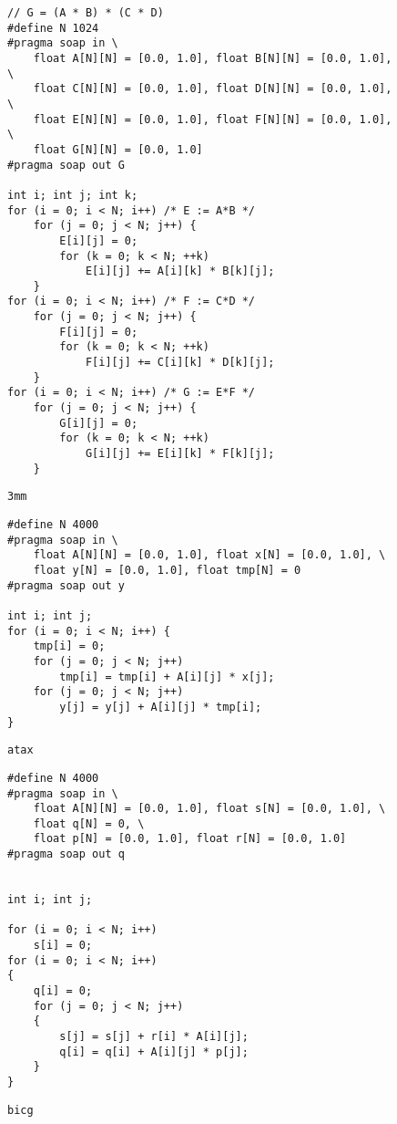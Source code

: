 \begin{figure}[ht]
\begin{lstlisting}
// G = (A * B) * (C * D)
#define N 1024
#pragma soap in \
    float A[N][N] = [0.0, 1.0], float B[N][N] = [0.0, 1.0], \
    float C[N][N] = [0.0, 1.0], float D[N][N] = [0.0, 1.0], \
    float E[N][N] = [0.0, 1.0], float F[N][N] = [0.0, 1.0], \
    float G[N][N] = [0.0, 1.0]
#pragma soap out G

int i; int j; int k;
for (i = 0; i < N; i++) /* E := A*B */
    for (j = 0; j < N; j++) {
        E[i][j] = 0;
        for (k = 0; k < N; ++k)
            E[i][j] += A[i][k] * B[k][j];
    }
for (i = 0; i < N; i++) /* F := C*D */
    for (j = 0; j < N; j++) {
        F[i][j] = 0;
        for (k = 0; k < N; ++k)
            F[i][j] += C[i][k] * D[k][j];
    }
for (i = 0; i < N; i++) /* G := E*F */
    for (j = 0; j < N; j++) {
        G[i][j] = 0;
        for (k = 0; k < N; ++k)
            G[i][j] += E[i][k] * F[k][j];
    }
\end{lstlisting}
\caption{\texttt{3mm}}
\end{figure}


\begin{figure}[ht]
\begin{lstlisting}
#define N 4000
#pragma soap in \
    float A[N][N] = [0.0, 1.0], float x[N] = [0.0, 1.0], \
    float y[N] = [0.0, 1.0], float tmp[N] = 0
#pragma soap out y

int i; int j;
for (i = 0; i < N; i++) {
    tmp[i] = 0;
    for (j = 0; j < N; j++)
        tmp[i] = tmp[i] + A[i][j] * x[j];
    for (j = 0; j < N; j++)
        y[j] = y[j] + A[i][j] * tmp[i];
}
\end{lstlisting}
\caption{\texttt{atax}}
\end{figure}


\begin{figure}[ht]
\begin{lstlisting}
#define N 4000
#pragma soap in \
    float A[N][N] = [0.0, 1.0], float s[N] = [0.0, 1.0], \
    float q[N] = 0, \
    float p[N] = [0.0, 1.0], float r[N] = [0.0, 1.0]
#pragma soap out q


int i; int j;

for (i = 0; i < N; i++)
    s[i] = 0;
for (i = 0; i < N; i++)
{
    q[i] = 0;
    for (j = 0; j < N; j++)
    {
        s[j] = s[j] + r[i] * A[i][j];
        q[i] = q[i] + A[i][j] * p[j];
    }
}
\end{lstlisting}
\caption{\texttt{bicg}}
\end{figure}


